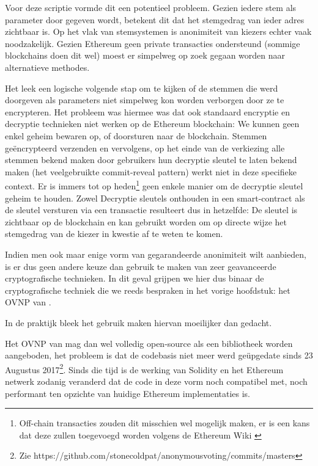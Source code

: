	Voor deze scriptie vormde dit een potentieel probleem. Gezien iedere stem als parameter door gegeven wordt, betekent dit dat het stemgedrag van ieder adres zichtbaar is. Op het vlak van stemsystemen is anonimiteit van kiezers  echter vaak noodzakelijk. Gezien Ethereum geen private transacties ondersteund (sommige blockchains doen dit wel)  moest er simpelweg op zoek gegaan worden naar alternatieve methodes. 
	
	Het leek een logische volgende stap om te kijken of  de stemmen die werd doorgeven als parameters niet simpelweg kon worden verborgen door ze te encrypteren. Het probleem was hiermee was dat ook standaard encryptie en decryptie technieken niet werken op de Ethereum blockchain: We kunnen geen enkel geheim bewaren op, of doorsturen naar de blockchain. Stemmen geëncrypteerd verzenden en vervolgens, op het einde van de verkiezing alle stemmen bekend maken door gebruikers hun decryptie sleutel te laten bekend maken (het veelgebruikte commit-reveal pattern) werkt niet in deze specifieke context. Er is immers tot op heden\footnote{Off-chain transacties zouden dit misschien wel mogelijk maken, er is een kans dat deze zullen toegevoegd worden volgens de Ethereum Wiki \autocite{Buterin2014}} geen enkele manier om de decryptie sleutel geheim te houden. Zowel Decryptie sleutels onthouden in een smart-contract als de sleutel versturen via een transactie resulteert dus in hetzelfde: De sleutel is zichtbaar op de blockchain en kan gebruikt worden om op directe wijze het stemgedrag van de kiezer in kwestie af te weten te komen.
	
	Indien men ook maar enige vorm van gegarandeerde anonimiteit wilt aanbieden, is er dus geen andere keuze dan gebruik te maken van zeer geavanceerde cryptografische technieken. In dit geval grijpen we hier dus binaar de cryptografische techniek die we reeds bespraken in het vorige hoofdstuk: het OVNP van \textcite{McCorry2017}. 
		
	In de praktijk bleek het gebruik maken hiervan moeilijker dan gedacht. 
	
	 Het OVNP van \textcite{McCorry2017} mag dan wel volledig open-source als een bibliotheek worden aangeboden, het probleem is dat de codebasis niet meer werd geüpgedate sinds 23 Augustus 2017\footnote{Zie https://github.com/stonecoldpat/anonymousvoting/commits/masters}. Sinds die tijd is de werking van Solidity en het Ethereum netwerk zodanig  veranderd dat de code in deze vorm noch compatibel met, noch performant ten opzichte van huidige Ethereum implementaties is. 
	 
